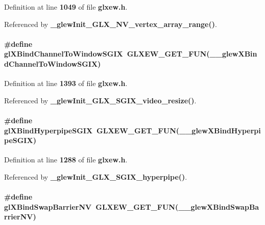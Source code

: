 Definition at line {\bf 1049} of file {\bf glxew.\+h}.



Referenced by {\bf \+\_\+glew\+Init\+\_\+\+G\+L\+X\+\_\+\+N\+V\+\_\+vertex\+\_\+array\+\_\+range()}.

\paragraph[{gl\+X\+Bind\+Channel\+To\+Window\+S\+G\+IX}]{\setlength{\rightskip}{0pt plus 5cm}\#define gl\+X\+Bind\+Channel\+To\+Window\+S\+G\+IX~{\bf G\+L\+X\+E\+W\+\_\+\+G\+E\+T\+\_\+\+F\+UN}({\bf \+\_\+\+\_\+glew\+X\+Bind\+Channel\+To\+Window\+S\+G\+IX})}\label{glxew_8h_a660bd12446cb5a8f1ae3a1e697c839d0}


Definition at line {\bf 1393} of file {\bf glxew.\+h}.



Referenced by {\bf \+\_\+glew\+Init\+\_\+\+G\+L\+X\+\_\+\+S\+G\+I\+X\+\_\+video\+\_\+resize()}.

\paragraph[{gl\+X\+Bind\+Hyperpipe\+S\+G\+IX}]{\setlength{\rightskip}{0pt plus 5cm}\#define gl\+X\+Bind\+Hyperpipe\+S\+G\+IX~{\bf G\+L\+X\+E\+W\+\_\+\+G\+E\+T\+\_\+\+F\+UN}({\bf \+\_\+\+\_\+glew\+X\+Bind\+Hyperpipe\+S\+G\+IX})}\label{glxew_8h_aee4ba30aabe8cfe8f9412e09eaf4d490}


Definition at line {\bf 1288} of file {\bf glxew.\+h}.



Referenced by {\bf \+\_\+glew\+Init\+\_\+\+G\+L\+X\+\_\+\+S\+G\+I\+X\+\_\+hyperpipe()}.

\paragraph[{gl\+X\+Bind\+Swap\+Barrier\+NV}]{\setlength{\rightskip}{0pt plus 5cm}\#define gl\+X\+Bind\+Swap\+Barrier\+NV~{\bf G\+L\+X\+E\+W\+\_\+\+G\+E\+T\+\_\+\+F\+UN}({\bf \+\_\+\+\_\+glew\+X\+Bind\+Swap\+Barrier\+NV})}\label{glxew_8h_a36f901ef7a84949a9b528db4ad1f3ca7}


